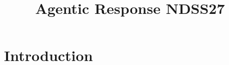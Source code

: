 \documentclass[conference]{IEEEtran}
\title{Agentic Response NDSS27}
\author{\IEEEauthorblockN{Anonymous Authors}
\IEEEauthorblockA{Anonymous Institutions}}
\begin{document}
\maketitle

\begin{abstract}
\end{abstract}

\section{Introduction}

\cite{gao2026incontext}


\end{document}
